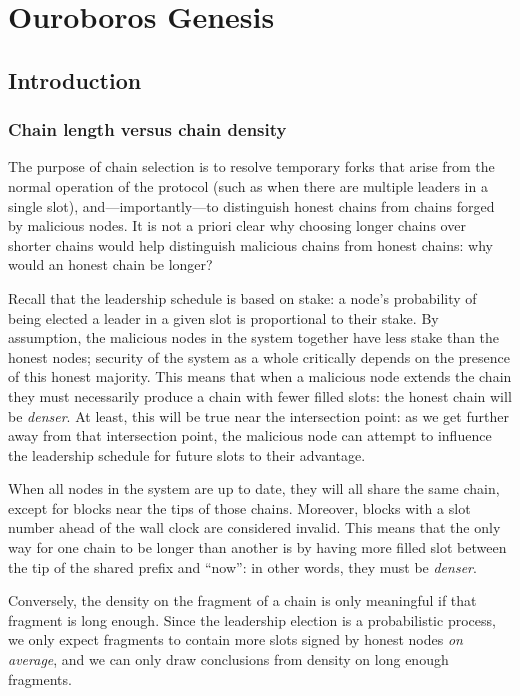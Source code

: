 \chapter{Ouroboros Genesis}
\label{genesis}

\section{Introduction}

\subsection{Chain length versus chain density}

The purpose of chain selection is to resolve temporary forks that arise from the
normal operation of the protocol (such as when there are multiple leaders in a
single slot), and---importantly---to distinguish honest chains from chains
forged by malicious nodes. It is not a priori clear why choosing longer chains
over shorter chains would help distinguish malicious chains from honest chains:
why would an honest chain be longer?

Recall that the leadership schedule is based on stake: a node's probability of
being elected a leader in a given slot is proportional to their stake. By
assumption, the malicious nodes in the system together have less stake than the
honest nodes; security of the system as a whole critically depends on the
presence of this honest majority. This means that when a malicious node extends
the chain they must necessarily produce a chain with fewer filled slots: the
honest chain will be \emph{denser}. At least, this will be true near the
intersection point: as we get further away from that intersection point, the
malicious node can attempt to influence the leadership schedule for future slots
to their advantage.

When all nodes in the system are up to date, they will all share the same
chain, except for blocks near the tips of those chains. Moreover, blocks with a
slot number ahead of the wall clock are considered invalid. This means that
the only way for one chain to be longer than another is by having more filled
slot between the tip of the shared prefix and ``now'': in other words, they
must be \emph{denser}.
%
\begin{center}
\end{center}
%
Conversely, the density on the fragment of a chain is only meaningful if that
fragment is long enough. Since the leadership election is a probabilistic
process, we only expect fragments to contain more slots signed by honest nodes
\emph{on average}, and we can only draw conclusions from density on long enough
fragments.


